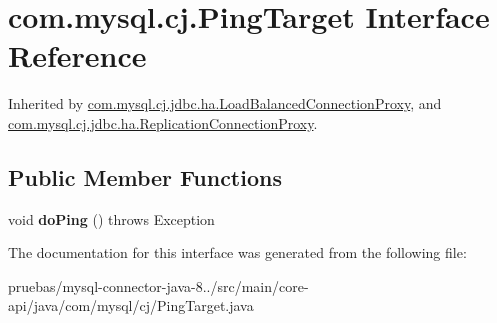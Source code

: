 \hypertarget{interfacecom_1_1mysql_1_1cj_1_1_ping_target}{}\section{com.\+mysql.\+cj.\+Ping\+Target Interface Reference}
\label{interfacecom_1_1mysql_1_1cj_1_1_ping_target}


Inherited by \mbox{\hyperlink{classcom_1_1mysql_1_1cj_1_1jdbc_1_1ha_1_1_load_balanced_connection_proxy}{com.\+mysql.\+cj.\+jdbc.\+ha.\+Load\+Balanced\+Connection\+Proxy}}, and \mbox{\hyperlink{classcom_1_1mysql_1_1cj_1_1jdbc_1_1ha_1_1_replication_connection_proxy}{com.\+mysql.\+cj.\+jdbc.\+ha.\+Replication\+Connection\+Proxy}}.

\subsection*{Public Member Functions}
\begin{DoxyCompactItemize}
\item 
\mbox{\label{interfacecom_1_1mysql_1_1cj_1_1_ping_target_a25b7277324c8bd6e4fc6334c042812b6}} 
void {\bfseries do\+Ping} ()  throws Exception
\end{DoxyCompactItemize}


The documentation for this interface was generated from the following file\+:\begin{DoxyCompactItemize}
\item 
pruebas/mysql-\/connector-\/java-\/8../src/main/core-\/api/java/com/mysql/cj/Ping\+Target.\+java\end{DoxyCompactItemize}
